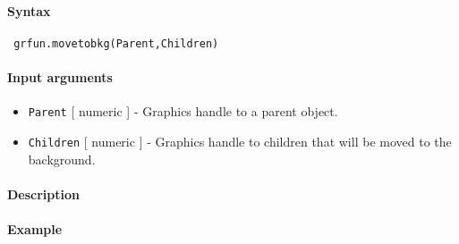 


	\paragraph{Syntax}
 
 \begin{verbatim}
 grfun.movetobkg(Parent,Children)
 \end{verbatim}
 
 \paragraph{Input arguments}
 
 \begin{itemize}
 \item
   \texttt{Parent} {[} numeric {]} - Graphics handle to a parent object.
 \item
   \texttt{Children} {[} numeric {]} - Graphics handle to children that
   will be moved to the background.
 \end{itemize}
 
 \paragraph{Description}
 
 \paragraph{Example}


